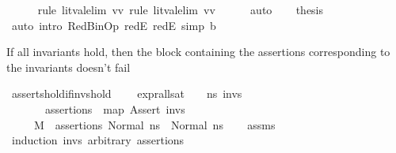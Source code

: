 \begin{isabellebody}
\ \ \ \ \isamarkupfalse%
\ {\isacharparenleft}{\kern0pt}rule\ lit{\isacharunderscore}{\kern0pt}val{\isacharunderscore}{\kern0pt}elim{\isacharbrackleft}{\kern0pt}\ v{\isacharequal}{\kern0pt}v{}{\isacharbrackright}{\kern0pt}{\isacharsemicolon}{\kern0pt}\ rule\ lit{\isacharunderscore}{\kern0pt}val{\isacharunderscore}{\kern0pt}elim{\isacharbrackleft}{\kern0pt}\ v{\isacharequal}{\kern0pt}v{}{\isacharbrackright}{\kern0pt}{\isacharparenright}{\kern0pt}\isanewline
\ \ \ \ \isamarkupfalse%
\ auto\isanewline
\isanewline
\ \ \isamarkupfalse%
\ {\isacharquery}{\kern0pt}thesis\isanewline
\ \ \ \ \isamarkupfalse%
\ {\isacharparenleft}{\kern0pt}auto\ intro{\isacharcolon}{\kern0pt}\ RedBinOp\ redE{}\ redE{}\ simp{\isacharcolon}{\kern0pt}\ {\isacartoucheopen}b\ {\isacharequal}{\kern0pt}\ {\isacharunderscore}{\kern0pt}{\isacartoucheclose}{\isacharparenright}{\kern0pt}\isanewline
{}\isamarkupfalse%
%
\endisatagproof
{\isafoldproof}%
%
\isadelimproof
%
\endisadelimproof
%
\begin{isamarkuptext}%
If all invariants hold, then the block containing the assertions corresponding to the invariants doesn't fail%
\end{isamarkuptext}\isamarkuptrue%
\isamarkupfalse%
\ asserts{\isacharunderscore}{\kern0pt}hold{\isacharunderscore}{\kern0pt}if{\isacharunderscore}{\kern0pt}invs{\isacharunderscore}{\kern0pt}hold{\isacharcolon}{\kern0pt}\ \isanewline
\ \ \ {\isachardoublequoteopen}expr{\isacharunderscore}{\kern0pt}all{\isacharunderscore}{\kern0pt}sat\ {\isasymLambda}\ {\isasymGamma}\ {\isasymOmega}\ ns{}\ invs{\isachardoublequoteclose}\isanewline
\ \ \ \ \ \ \ {\isachardoublequoteopen}assertions\ {\isacharequal}{\kern0pt}\ map\ Assert\ invs{\isachardoublequoteclose}\isanewline
\ \ \ \ \ {\isachardoublequoteopen}M{\isacharcomma}{\kern0pt}{\isasymLambda}{\isacharcomma}{\kern0pt}{\isasymGamma}{\isacharcomma}{\kern0pt}{\isasymOmega}\ {\isasymturnstile}\ {\isasymlangle}assertions{\isacharcomma}{\kern0pt}\ Normal\ ns{}{\isasymrangle}\ {\isacharbrackleft}{\kern0pt}{\isasymrightarrow}{\isacharbrackright}{\kern0pt}\ Normal\ ns{}{\isachardoublequoteclose}\isanewline
%
\isadelimproof
\ \ %
\endisadelimproof
%
\isatagproof
{}\isamarkupfalse%
\ assms\isanewline
{}\isamarkupfalse%
\ {\isacharparenleft}{\kern0pt}induction\ invs\ arbitrary{\isacharcolon}{\kern0pt}\ assertions{\isacharparenright}{\kern0pt}\isanewline

\end{isabellebody}

